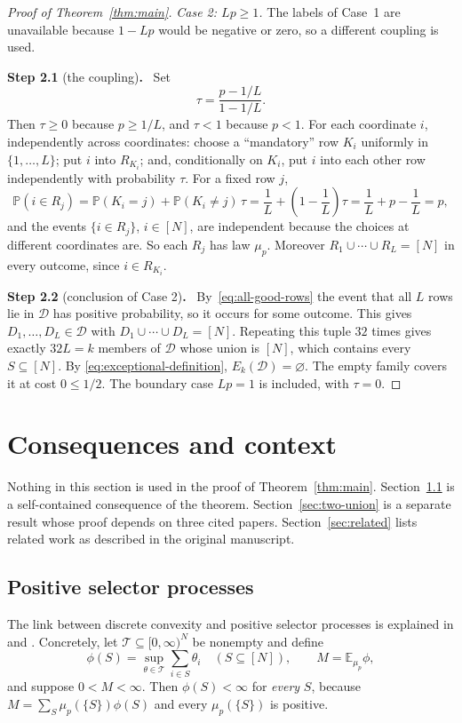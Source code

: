 \documentclass[11pt,letterpaper]{article}
\theoremstyle{definition}
\theoremstyle{remark}
\numberwithin{equation}{section}
\newcommand{\step}[2]{\medskip\noindent\textbf{Step #1} (#2)\textbf{.}\ }
\begin{document}
\begin{proof}[Proof of Theorem~\ref{thm:main}]
\medskip
\noindent\emph{Case 2: $Lp\ge1$.} The labels of Case~1 are unavailable
because $1-Lp$ would be negative or zero, so a different coupling is used.

\step{2.1}{the coupling}
Set
\[
\tau=\frac{p-1/L}{1-1/L}.
\]
Then $\tau\ge0$ because $p\ge1/L$, and $\tau<1$ because $p<1$. For each
coordinate $i$, independently across coordinates: choose a ``mandatory''
row $K_i$ uniformly in $\{1,\ldots,L\}$; put $i$ into $R_{K_i}$; and,
conditionally on $K_i$, put $i$ into each other row independently with
probability $\tau$. For a fixed row $j$,
\[
\mathbb P(i\in R_j)
=\mathbb P(K_i=j)+\mathbb P(K_i\ne j)\,\tau
=\frac1L+\left(1-\frac1L\right)\tau=\frac1L+p-\frac1L=p,
\]
and the events $\{i\in R_j\}$, $i\in[N]$, are independent because the
choices at different coordinates are. So each $R_j$ has law $\mu_p$.
Moreover $R_1\cup\cdots\cup R_L=[N]$ in every outcome, since
$i\in R_{K_i}$.

\step{2.2}{conclusion of Case 2}
By~\eqref{eq:all-good-rows} the event that all $L$ rows lie in
$\mathcal D$ has positive probability, so it occurs for some outcome. This
gives $D_1,\ldots,D_L\in\mathcal D$ with $D_1\cup\cdots\cup D_L=[N]$.
Repeating this tuple $32$ times gives exactly $32L=k$ members of
$\mathcal D$ whose union is $[N]$, which contains every $S\subseteq[N]$.
By \eqref{eq:exceptional-definition}, $E_k(\mathcal D)=\varnothing$. The
empty family covers it at cost $0\le1/2$. The boundary case $Lp=1$ is
included, with $\tau=0$.
\end{proof}

\section{Consequences and context}
\label{sec:context}

Nothing in this section is used in the proof of Theorem~\ref{thm:main}.
Section~\ref{sec:selectors} is a self-contained consequence of the
theorem. Section~\ref{sec:two-union} is a separate result whose proof
depends on three cited papers. Section~\ref{sec:related} lists related
work as described in the original manuscript.

\subsection{Positive selector processes}
\label{sec:selectors}

The link between discrete convexity and positive selector processes is
explained in \cite[Section~7]{Talagrand10} and
\cite[Proposition~13.3.3]{Talagrand21}. Concretely, let
$\mathcal T\subseteq[0,\infty)^N$ be nonempty and define
\[
\phi(S)=\sup_{\theta\in\mathcal T}\sum_{i\in S}\theta_i\quad(S\subseteq[N]),
\qquad M=\mathbb E_{\mu_p}\phi,
\]
and suppose $0<M<\infty$. Then $\phi(S)<\infty$ for \emph{every} $S$,
because $M=\sum_S\mu_p(\{S\})\phi(S)$ and every $\mu_p(\{S\})$ is
positive.
\end{document}
